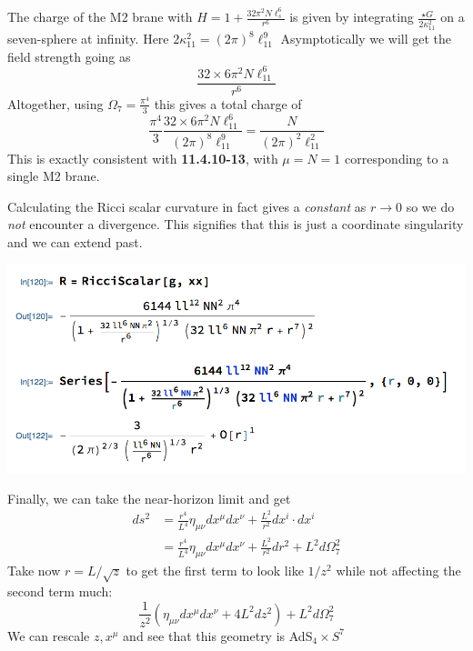 \documentclass[11pt, class=article, crop=false]{standalone}
\begin{document}
\begin{enumerate}
	The charge of the M2 brane with $H = 1 + \frac{32 \pi^2 N \ell_s^6}{r^6}$ is given by integrating $\frac{\star G}{2\kappa_{11}^2}$ on a seven-sphere at infinity. Here $2 \kappa_{11}^2 = (2\pi)^8 \ell_{11}^9$ Asymptotically we will get the field strength going as
	\[
		\frac{32 \times 6 \pi^2 N \ell_{11}^6}{r^6}
	\]
	Altogether, using $\Omega_7 = \frac{\pi^4}{3}$ this gives a total charge of
	\[
		\frac{\pi^4}{3} \frac{32 \times 6 \pi^2 N \ell_{11}^6}{(2\pi)^8 \ell_{11}^9} = \frac{N}{(2\pi)^2 \ell_{11}^2}
	\]
	This is exactly consistent with \textbf{11.4.10-13}, with $\mu = N = 1$ corresponding to a single M2 brane. 
	
	Calculating the Ricci scalar curvature in fact gives a \emph{constant} as $r \to 0$ so we do \emph{not} encounter a divergence. This signifies that this is just a coordinate singularity and we can extend past. 
	\begin{center}
		\includegraphics[scale=0.5]{"Figures/M2 Ricci"}
	\end{center}
	Finally, we can take the near-horizon limit and get
	\[
	\begin{aligned}
		ds^2 &= \frac{r^4}{L^4} \eta_{\mu \nu} dx^\mu dx^\nu + \frac{L^2}{r^2} dx^i \cdot dx^i\\
		 &= \frac{r^4}{L^4} \eta_{\mu \nu} dx^\mu dx^\nu + \frac{L^2}{r^2} dr^2  + L^2 d \Omega_7^2
	\end{aligned}
	\]
	Take now $r = L/\sqrt{z}$ to get the first term to look like $1/z^2$ while not affecting the second term much:
	\[
		\frac{1}{z^2} (\eta_{\mu \nu} dx^\mu dx^\nu + 4 L^2 dz^2) + L^2 d \Omega_7^2
	\]
	We can rescale $z, x^\mu$ and see that  this geometry is AdS$_4 \times S^7$ 
	

\end{enumerate}
\end{document}
